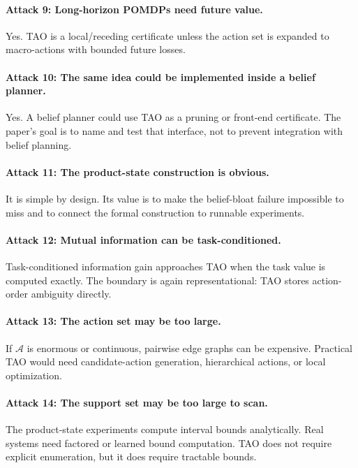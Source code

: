 \documentclass{article}
\newcommand{\actions}{\mathcal{A}}
\begin{document}
\paragraph{Attack 9: Long-horizon POMDPs need future value.}
Yes. TAO is a local/receding certificate unless the action set is expanded to macro-actions with bounded future losses.

\paragraph{Attack 10: The same idea could be implemented inside a belief planner.}
Yes. A belief planner could use TAO as a pruning or front-end certificate. The paper's goal is to name and test that interface, not to prevent integration with belief planning.

\paragraph{Attack 11: The product-state construction is obvious.}
It is simple by design. Its value is to make the belief-bloat failure impossible to miss and to connect the formal construction to runnable experiments.

\paragraph{Attack 12: Mutual information can be task-conditioned.}
Task-conditioned information gain approaches TAO when the task value is computed exactly. The boundary is again representational: TAO stores action-order ambiguity directly.

\paragraph{Attack 13: The action set may be too large.}
If $\actions$ is enormous or continuous, pairwise edge graphs can be expensive. Practical TAO would need candidate-action generation, hierarchical actions, or local optimization.

\paragraph{Attack 14: The support set may be too large to scan.}
The product-state experiments compute interval bounds analytically. Real systems need factored or learned bound computation. TAO does not require explicit enumeration, but it does require tractable bounds.
\end{document}
